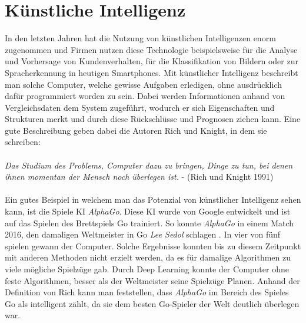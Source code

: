 \section{Künstliche Intelligenz}\label{s.ki}
In den letzten Jahren hat die Nutzung von künstlichen Intelligenzen enorm zugenommen und Firmen nutzen diese Technologie beispielsweise für die Analyse und Vorhersage von Kundenverhalten, für die Klassifikation von Bildern oder zur Spracherkennung in heutigen Smartphones. Mit künstlicher Intelligenz beschreibt man solche Computer, welche gewisse Aufgaben erledigen, ohne ausdrücklich dafür programmiert worden zu sein. Dabei werden Informationen anhand von Vergleichsdaten dem System zugeführt, wodurch er sich Eigenschaften und Strukturen merkt und durch diese Rückschlüsse und Prognosen ziehen kann. Eine gute Beschreibung geben dabei die Autoren Rich und Knight, in dem sie schreiben:\\\\
 \textit{Das Studium des Problems, Computer dazu zu bringen, Dinge zu tun, bei denen ihnen momentan der Mensch noch überlegen ist.} - (Rich und Knight 1991)\\\\
Ein gutes Beispiel in welchem man das Potenzial von künstlicher Intelligenz sehen kann, ist die Spiele KI  \textit{AlphaGo}. Diese KI wurde von Google entwickelt und ist auf das Spielen des Brettspiels Go trainiert. So konnte \textit{AlphaGo} in einem Match 2016, den damaligen Weltmeister in Go \textit{Lee Sedol} schlagen \cite{Alpha2016GO}. In vier von fünf spielen gewann der Computer. Solche Ergebnisse konnten bis zu diesem Zeitpunkt mit anderen Methoden nicht erzielt werden, da es für damalige Algorithmen zu viele mögliche Spielzüge gab. Durch Deep Learning konnte der Computer ohne feste Algorithmen, besser als der Weltmeister seine Spielzüge Planen. Anhand der Definition von Rich kann man feststellen, dass  \textit{AlphaGo}  im Bereich des Spieles Go als intelligent zählt, da sie dem besten Go-Spieler der Welt deutlich überlegen war.

